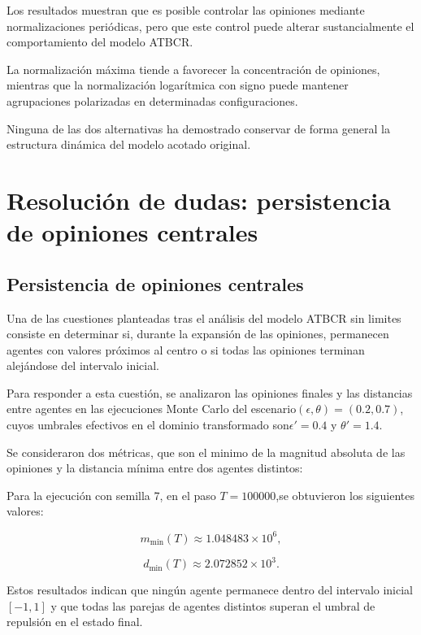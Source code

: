 \documentclass[11pt,a4paper]{article}
\begin{document}
Los resultados muestran que es posible controlar las opiniones mediante normalizaciones periódicas, pero que este control puede alterar sustancialmente el comportamiento del modelo ATBCR.

La normalización máxima tiende a favorecer la concentración de opiniones, mientras que la normalización logarítmica con signo puede mantener agrupaciones polarizadas en determinadas configuraciones.

Ninguna de las dos alternativas ha demostrado conservar de forma general la estructura dinámica del modelo acotado original.



\section{Resolución de dudas: persistencia de opiniones centrales}
\label{subsec:exp03_opiniones_centrales}


\subsection{Persistencia de opiniones centrales}

Una de las cuestiones planteadas tras el análisis del modelo ATBCR sin limites consiste en determinar si, durante la expansión de las opiniones, permanecen agentes con valores  próximos al centro o si todas las opiniones terminan alejándose del intervalo inicial.

Para responder a esta cuestión, se analizaron las opiniones finales y las distancias entre agentes en las ejecuciones Monte Carlo del escenario$(\epsilon,\theta)=(0.2,0.7)$, cuyos umbrales efectivos en el dominio transformado son$\epsilon'=0.4$ y $\theta'=1.4$.

Se consideraron dos métricas, que son el minimo de la magnitud absoluta de las opiniones y la distancia mínima entre dos agentes distintos:

Para la ejecución con semilla 7, en el paso $T=100000$,se obtuvieron los siguientes valores:

\begin{equation}
    m_{\min}(T)\approx 1.048483\times10^6,
\end{equation}

\begin{equation}
    d_{\min}(T)\approx 2.072852\times10^3.
\end{equation}


Estos resultados indican que ningún agente permanece dentro del intervalo inicial $[-1,1]$ y que todas las parejas de agentes distintos superan el umbral de repulsión en el estado final.
\end{document}
